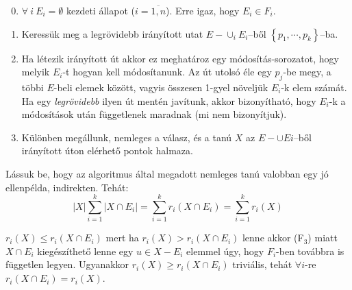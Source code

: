 \begin{enumerate}
    \setcounter{enumi}{-1}
    \item $\forall~i~E_i = \emptyset$ kezdeti állapot ($i=\overline{1,n}$). Erre
    igaz, hogy $E_i \in F_i$.
    \item Keressük meg a legrövidebb irányított utat $E-\cup_{i}E_i$--ből
    $\left\{ p_1, \cdots, p_k \right\}$--ba.
    
    \item Ha létezik irányított út akkor ez meghatároz egy módosítás-sorozatot,
    hogy melyik $E_i$-t hogyan kell módosítanunk. Az út utolsó éle egy $p_j$-be
    megy, a többi $E$-beli elemek között, vagyis összesen 1-gyel növeljük
    $E_i$-k elem számát.  Ha egy {\it legrövidebb} ilyen út mentén javítunk,
    akkor bizonyítható, hogy $E_i$-k a módosítások után függetlenek maradnak (mi
    nem bizonyítjuk).
    \item Különben megállunk, nemleges a válasz, és a tanú $X$ az $E- \cup Ei$--ből
    irányított úton elérhető pontok halmaza.
\end{enumerate} 

Lássuk be, hogy az algoritmus által megadott nemleges tanú valobban egy jó
ellenpélda, indirekten. Tehát:
\[ 
|X| \sum_{i=1}^k |X \cap E_i| = \sum_{i=1}^k r_i(X \cap E_i) = \sum_{i=1}^k r_i(X) 
\]

$r_i(X) \leq r_i(X \cap E_i)$ mert ha $r_i(X) > r_i(X \cap E_i)$  lenne akkor
(F$_3$) miatt $X \cap E_i$ kiegészíthető lenne egy $u \in X - E_i$ elemmel úgy,
hogy $F_i$-ben továbbra is független legyen. Ugyanakkor $r_i(X) \geq r_i(X \cap
E_i)$ triviális, tehát $\forall i$-re $r_i(X \cap E_i) = r_i(X)$.

